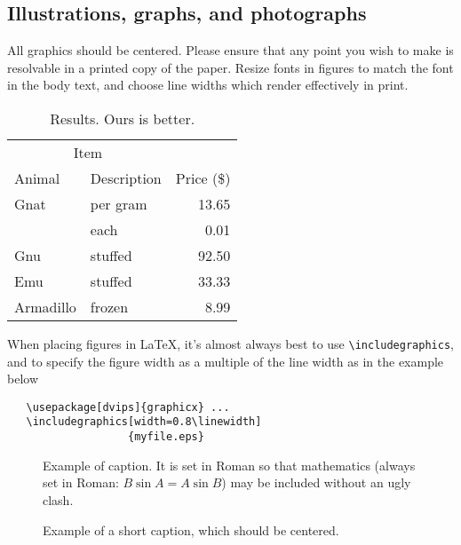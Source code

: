 \documentclass[12pt,twoside,a4paper]{article}
\begin{document}
\subsection{Illustrations, graphs, and photographs}

All graphics should be centered.  Please ensure that any point you wish to
make is resolvable in a printed copy of the paper.  Resize fonts in figures
to match the font in the body text, and choose line widths which render
effectively in print. 

\begin{table}[!ht]
\centering
\begin{tabular}{llr}  
\toprule
\multicolumn{2}{c}{Item} \\
\cmidrule(r){1-2}
Animal    & Description & Price (\$) \\
\midrule
Gnat      & per gram    & 13.65      \\
          &    each     & 0.01       \\
Gnu       & stuffed     & 92.50      \\
Emu       & stuffed     & 33.33      \\
Armadillo & frozen      & 8.99       \\
\bottomrule
\end{tabular}
\caption{Results.   Ours is better. \label{tab:eg}}
\end{table}

When placing figures in \LaTeX, it's almost always best to use \verb+\includegraphics+, and to specify the  figure width as a multiple of the line width as in the example below
{\small\begin{verbatim}
   \usepackage[dvips]{graphicx} ...
   \includegraphics[width=0.8\linewidth]
                   {myfile.eps}
\end{verbatim}
}

\begin{figure}[t]
\begin{center}
\fbox{\rule{0pt}{2in} \rule{0.9\linewidth}{0pt}}
\end{center}
   \caption{Example of caption.  It is set in Roman so that mathematics (always set in Roman: $B \sin A = A \sin B$) may be included without an ugly clash.}
\label{fig:long}
\label{fig:onecol}
\end{figure}

\begin{figure}[t]
\begin{center}
\fbox{\rule{0pt}{2in} \rule{.5\linewidth}{0pt}}
\end{center}
   \caption{Example of a short caption, which should be centered.}
\label{fig:short}
\end{figure}
\end{document}
